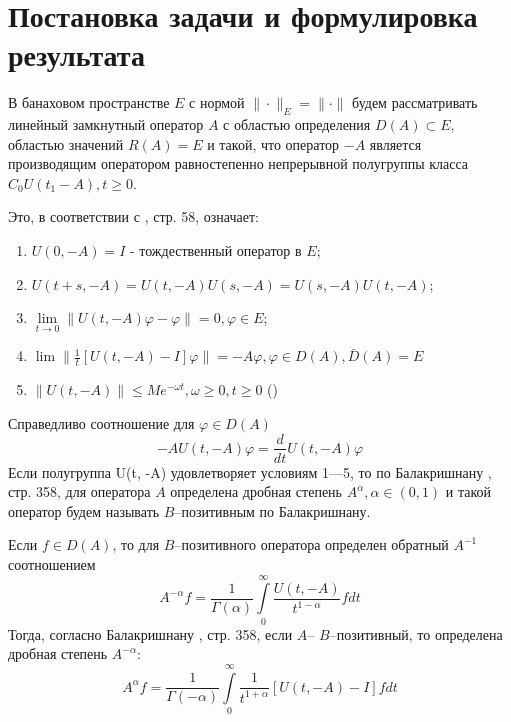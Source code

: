 \documentclass{cmfnre}
\theoremstyle{plain}
\numberwithin{equation}{section}
\begin{document}
\section{Постановка задачи и формулировка результата}

В банаховом пространстве $E$ с нормой $\|\cdot\|_E = \|\cdot\|$ будем рассматривать линейный замкнутный
оператор $A$ с областью определения $D(A) \subset E$, областью значений $R(A) = E$  и такой, что
оператор $-A$ является производящим оператором равностепенно непрерывной полугруппы класса
$C_0 U(t_1 - A), t \ge 0$.

Это, в соответствии с \cite{Iosida}, стр. 58, означает:
\begin{enumerate}
    \item $U(0, -A) = I$ - тождественный оператор в $E$;
    \item $U(t+s, -A) = U(t, -A)U(s, -A) = U(s, -A)U(t, -A)$;
    \item $\lim\limits_{t\to0} \|U(t, -A)\varphi-\varphi\| = 0, \varphi \in E$;
    \item $\lim{} \|\frac{1}{t}[U(t, -A)-I]\varphi\| = -A\varphi, \varphi \in D(A), \bar{D}(A) = E$
    \item $\|U(t, -A)\| \le Me^{-\omega t}, \omega \ge 0, t \ge 0$
    \hfill{}(\theequation)
\end{enumerate}

Справедливо соотношение для $\varphi \in D(A)$
\begin{equation}
    -A U(t, -A)\varphi = \frac{d}{dt} U(t, -A)\varphi
\end{equation}
Если полугруппа U(t, -A) удовлетворяет условиям 1---5, то по Балакришнану \cite{Iosida}, стр. 358, для оператора $A$ определена
дробная степень $A^\alpha, \alpha \in (0, 1)$ и такой оператор будем называть $B$--позитивным по
Балакришнану.

Если $f \in D(A)$, то для $B$--позитивного оператора определен обратный $A^{-1}$ соотношением
\begin{equation}
    A^{-\alpha}f = \frac{1}{\Gamma(\alpha)} \int\limits_0^\infty \frac{U(t, -A)}{t^{1-\alpha}} fdt
\end{equation}
Тогда, согласно Балакришнану \cite{Iosida}, стр. 358, если $A$-- $B$--позитивный, то определена дробная степень $A^{-\alpha}$:
\begin{equation}
    A^{\alpha}f = \frac{1}{\Gamma(-\alpha)} \int\limits_0^\infty \frac{1}{t^{1 + \alpha}} [U(t, -A) - I] fdt
\end{equation}
\end{document}
